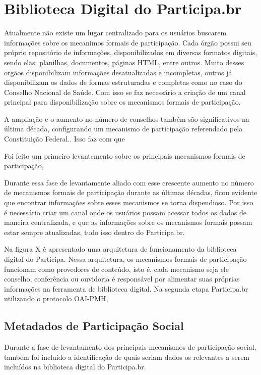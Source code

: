 \chapter{Biblioteca Digital do Participa.br}

Atualmente não existe um lugar centralizado para os usuários buscarem informações sobre os mecanimos formais de participação. Cada órgão possui seu próprio repositório de informações, disponibilizados em diversas formatos digitais, sendo elas: planilhas, documentos, páginas HTML, entre outros. Muito desses orgãos disponibilizam informações desatualizadas e incompletas, outros já disponibilizam os dados de formas estruturadas e completas como no caso do Conselho Nacional de Saúde. Com isso se faz necessário a criação de um canal principal para disponibilização sobre os mecanismos formais de participação.

A ampliação e o aumento no número de conselhos também são significativos na última década, configurando um mecanismo de participação referendado pela Constituição Federal.\cite{solagna2014metodologias}. Isso faz com que

Foi feito um primeiro levantemento sobre os principais mecanismos formais de participação,

Durante essa fase de levantamente aliado com esse crescente aumento no número de mecanismos formais de participação durante as últimas décadas, ficou evidente que encontrar informações sobre esses mecanismos se torna dispendioso. Por isso é necessário criar um canal onde os usuários possam acessar todos os dados de maneira centralizada, e que as informações sobre os mecanismos formais possam estar sempre atualizadas, tudo isso dentro do Participa.br.

Na figura X é apresentado uma arquitetura de funcionamento da biblioteca digital do Participa. Nessa arquitetura, os mecanismos formais de participação funcionam como provedores de conteúdo, isto é, cada mecanismo seja ele conselho, conferência ou ouvidoria é responsável por alimentar suas próprias informações na ferramenta de biblioteca digital. Na segunda etapa Participa.br utilizando o protocolo OAI-PMH, 
 
\section{Metadados de Participação Social}

Durante a fase de levantamento dos principais mecanismos de participação social, também foi incluído a identificação de quais seriam dados os relevantes a serem incluídos na biblioteca digital do Participa.br.

